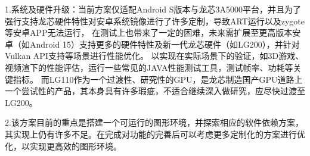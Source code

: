 1.系统及硬件升级：当前方案仅适配Android S版本与龙芯3A5000平台，并且为了强行支持龙芯硬件特性对安卓系统镜像进行了许多定制，导致ART运行以及zygote等安卓APP无法运行，
在测试上也带来了一定的困难，未来需扩展至更高版本安卓（如Android 15）支持更多的硬件特性及新一代龙芯硬件（如LG200），并针对Vulkan API支持等场景进行性能优化。
以实现在实际场景下的验证，如3D游戏、视频渲下的性能评估，运行一些常见的JAVA性能测试工具，测试帧率、功耗等关键指标。
而LG110作为一个过渡性、研究性的GPU，是龙芯制造国产GPU道路上一个尝试性的产品，其本身具有许多瑕疵，不适合继续深入做研究，应尽快过渡至LG200。

2.该方案目前的重点是搭建一个可运行的图形环境，并探索相应的软件依赖方案，其实现上仍有许多不足。在完成对功能的完善后可以考虑更多定制化的方案进行优化，以实现更高效的图形环境。

